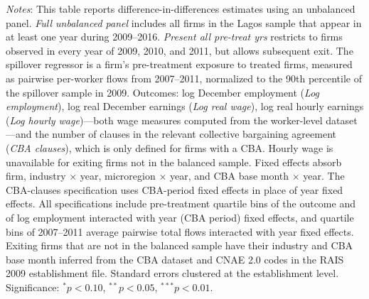 \begin{table}[H]
\begin{minipage}{\textwidth}
\textit{Notes}: This table reports difference-in-differences estimates using an unbalanced panel. \textit{Full unbalanced panel} includes all firms in the Lagos sample that appear in at least one year during 2009--2016. \textit{Present all pre-treat yrs} restricts to firms observed in every year of 2009, 2010, and 2011, but allows subsequent exit. The spillover regressor is a firm's pre-treatment exposure to treated firms, measured as pairwise per-worker flows from 2007--2011, normalized to the 90th percentile of the spillover sample in 2009. Outcomes: log December employment (\textit{Log employment}), log real December earnings (\textit{Log real wage}), log real hourly earnings (\textit{Log hourly wage})---both wage measures computed from the worker-level dataset---and the number of clauses in the relevant collective bargaining agreement (\textit{CBA clauses}), which is only defined for firms with a CBA. Hourly wage is unavailable for exiting firms not in the balanced sample. Fixed effects absorb firm, industry $\times$ year, microregion $\times$ year, and CBA base month $\times$ year. The CBA-clauses specification uses CBA-period fixed effects in place of year fixed effects. All specifications include pre-treatment quartile bins of the outcome and of log employment interacted with year (CBA period) fixed effects, and quartile bins of 2007--2011 average pairwise total flows interacted with year fixed effects. Exiting firms that are not in the balanced sample have their industry and CBA base month inferred from the CBA dataset and CNAE 2.0 codes in the RAIS 2009 establishment file. Standard errors clustered at the establishment level. Significance: $^{*}p{<}0.10$, $^{**}p{<}0.05$, $^{***}p{<}0.01$.
\end{minipage}
\end{table}
